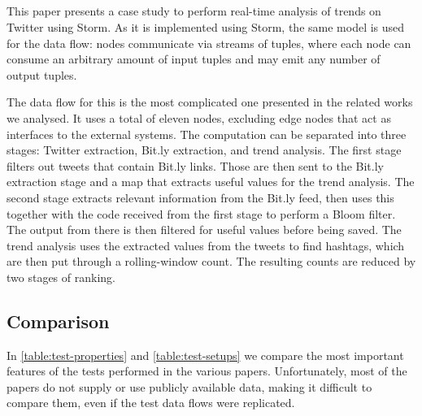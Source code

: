 \subsection{}
This paper presents a case study to perform real-time analysis of trends on Twitter using Storm. As it is implemented using Storm, the same model is used for the data flow: nodes communicate via streams of tuples, where each node can consume an arbitrary amount of input tuples and may emit any number of output tuples. \\


The data flow for this is the most complicated one presented in the related works we analysed. It uses a total of eleven nodes, excluding edge nodes that act as interfaces to the external systems. The computation can be separated into three stages: Twitter extraction, Bit.ly extraction, and trend analysis. The first stage filters out tweets that contain Bit.ly links. Those are then sent to the Bit.ly extraction stage and a map that extracts useful values for the trend analysis. The second stage extracts relevant information from the Bit.ly feed, then uses this together with the code received from the first stage to perform a Bloom filter. The output from there is then filtered for useful values before being saved. The trend analysis uses the extracted values from the tweets to find hashtags, which are then put through a rolling-window count. The resulting counts are reduced by two stages of ranking.

\subsection{Comparison}
In \autoref{table:test-properties} and \autoref{table:test-setups} we compare the most important features of the tests performed in the various papers. Unfortunately, most of the papers do not supply or use publicly available data, making it difficult to compare them, even if the test data flows were replicated.

